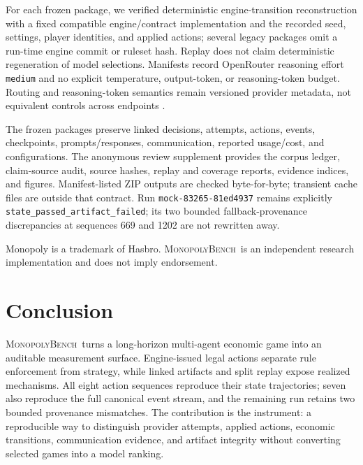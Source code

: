 \documentclass[conference]{IEEEtran}
\newcommand{\Bench}{\textsc{MonopolyBench}}
\newcommand{\runid}[1]{\nolinkurl{#1}}
\begin{document}
For each frozen package, we verified deterministic engine-transition
reconstruction with a fixed compatible engine/contract implementation and the
recorded seed, settings, player identities, and applied actions; several legacy
packages omit a run-time engine commit or ruleset hash. Replay does not claim
deterministic regeneration of model selections. Manifests record OpenRouter
reasoning effort \texttt{medium} and no explicit temperature, output-token, or
reasoning-token budget. Routing and reasoning-token semantics remain versioned
provider metadata, not equivalent controls across endpoints
\cite{openrouter_docs}.

The frozen packages preserve linked decisions, attempts, actions, events,
checkpoints, prompts/responses, communication, reported usage/cost, and
configurations. The anonymous review supplement provides the corpus ledger,
claim-source audit, source hashes, replay and coverage reports, evidence
indices, and figures. Manifest-listed ZIP outputs are checked byte-for-byte;
transient cache files are outside that contract. Run
\runid{mock-83265-81ed4937} remains explicitly
\texttt{state\_passed\_artifact\_failed}; its two bounded
fallback-provenance discrepancies at sequences 669 and 1202 are not rewritten
away.

Monopoly is a trademark of Hasbro. \Bench\ is an independent research
implementation and does not imply endorsement.

\section{Conclusion}
\label{sec:conclusion}

\Bench\ turns a long-horizon multi-agent economic game into an auditable
measurement surface. Engine-issued legal actions separate rule enforcement
from strategy, while linked artifacts and split replay expose realized
mechanisms. All eight action sequences reproduce their state trajectories;
seven also reproduce the full canonical event stream, and the remaining run
retains two bounded provenance mismatches. The contribution is the instrument:
a reproducible way to distinguish provider attempts, applied actions, economic
transitions, communication evidence, and artifact integrity without converting
selected games into a model ranking.
\end{document}
